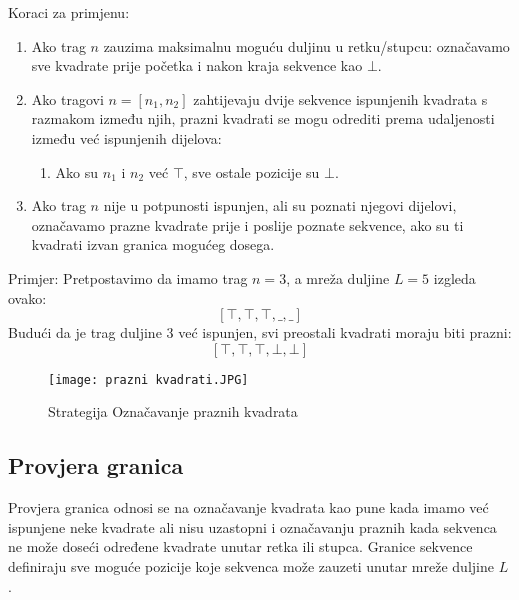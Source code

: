 \documentclass[a4paper,12pt]{article}
\begin{document}
Koraci za primjenu:
\begin{enumerate}
    \item Ako trag $n$ zauzima maksimalnu moguću duljinu u retku/stupcu: označavamo sve kvadrate prije početka i nakon kraja sekvence kao $\bot$.
    \item Ako tragovi $n = [n_1, n_2]$ zahtijevaju dvije sekvence ispunjenih kvadrata s razmakom između njih, prazni kvadrati se mogu odrediti prema udaljenosti između već ispunjenih dijelova:
    \begin{enumerate}
        \item Ako su $n_1$ i $n_2$ već $\top$, sve ostale pozicije su $\bot$.
    \end{enumerate}
    \item Ako trag $n$ nije u potpunosti ispunjen, ali su poznati njegovi dijelovi, označavamo prazne kvadrate prije i poslije poznate sekvence, ako su ti kvadrati izvan granica mogućeg dosega.
\end{enumerate}

Primjer:
Pretpostavimo da imamo trag $n = 3$, a mreža duljine $L=5$ izgleda ovako:
\[
[\top, \top, \top, \_, \_]
\]
Budući da je trag duljine 3 već ispunjen, svi preostali kvadrati moraju biti prazni:
\[
[\top, \top, \top, \bot, \bot]
\]
\clearpage
\begin{figure}[h]
\centering
\texttt{[image: prazni kvadrati.JPG]}
\caption{Strategija Označavanje praznih kvadrata}
\end{figure}

\subsection{Provjera granica}  
Provjera granica odnosi se na označavanje kvadrata kao pune kada imamo već ispunjene neke kvadrate ali nisu uzastopni i označavanju praznih kada sekvenca ne može doseći određene kvadrate unutar retka ili stupca. Granice sekvence definiraju sve moguće pozicije koje sekvenca može zauzeti unutar mreže duljine $L$. 
\end{document}
